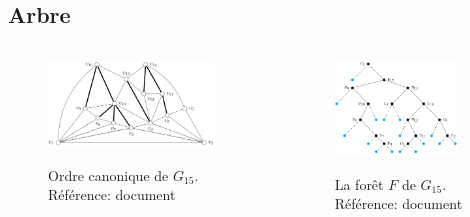 \documentclass[10pt]{beamer}
\begin{document}
\subsection{Arbre} 	
{
\begin{frame}{}

\begin{columns}
    \begin{column}{0.6\textwidth}
    \begin{figure}
		\centering
		\includegraphics[width=0.9\textwidth]{oc4.png}\\[.1cm]
    \caption[caption]{Ordre canonique de $G_{15}$. \\\vspace*{0.2cm} Référence: document \citeauthor{PhilippKindermann}}	
	\end{figure}
    \end{column}
    
    \begin{column}{0.4\textwidth}
    \begin{figure}
		\centering
		\includegraphics[width=0.9\textwidth]{oc3.png}\\[.1cm]
    \caption[caption]{La forêt $F$ de $G_{15}$. \\\vspace*{0.2cm} Référence: document \citeauthor{PhilippKindermann}}	
	\end{figure}
    \end{column}
\end{columns}  


\end{frame}}
\end{document}
